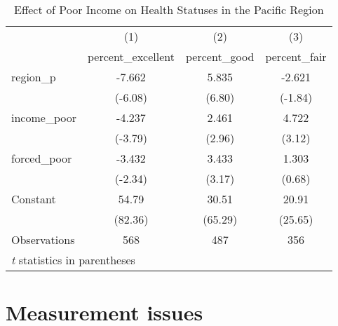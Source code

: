 \documentclass[12pt]{article}
\begin{document}
\begin{table}[htbp]\centering \caption{Effect of Poor Income on Health Statuses in the Pacific Region\label{ppoor}} \begin{tabular}{l*{3}{c}} \toprule
                    &\multicolumn{1}{c}{(1)}&\multicolumn{1}{c}{(2)}&\multicolumn{1}{c}{(3)}\\
                    &\multicolumn{1}{c}{percent\_excellent}&\multicolumn{1}{c}{percent\_good}&\multicolumn{1}{c}{percent\_fair}\\
\midrule
region\_p            &      -7.662&       5.835&      -2.621\\
                    &     (-6.08)&      (6.80)&     (-1.84)\\
\addlinespace
income\_poor         &      -4.237&       2.461&       4.722\\
                    &     (-3.79)&      (2.96)&      (3.12)\\
\addlinespace
forced\_poor         &      -3.432&       3.433&       1.303\\
                    &     (-2.34)&      (3.17)&      (0.68)\\
\addlinespace
Constant            &       54.79&       30.51&       20.91\\
                    &     (82.36)&     (65.29)&     (25.65)\\
\midrule
Observations        &         568&         487&         356\\
\bottomrule
\multicolumn{4}{l}{\footnotesize \textit{t} statistics in parentheses}\\
\end{tabular}
\end{table}


\section{Measurement issues}

\end{document}
